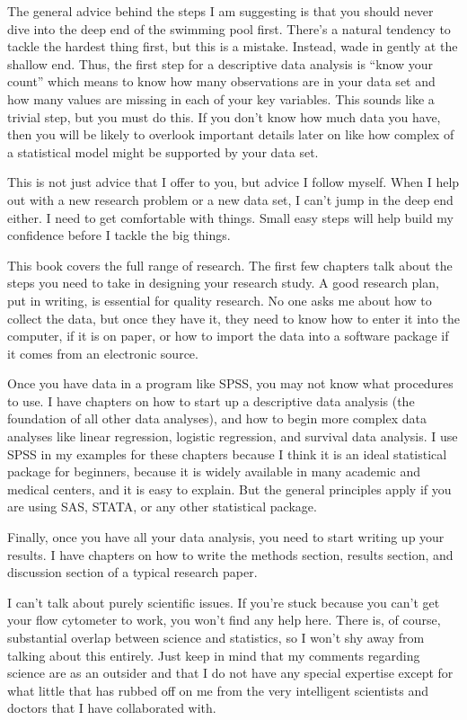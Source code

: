 \documentclass[
  letterpaper,
  DIV=11,
  numbers=noendperiod]{scrreprt}
\begin{document}
The general advice behind the steps I am suggesting is that you should
never dive into the deep end of the swimming pool first. There's a
natural tendency to tackle the hardest thing first, but this is a
mistake. Instead, wade in gently at the shallow end. Thus, the first
step for a descriptive data analysis is ``know your count'' which means
to know how many observations are in your data set and how many values
are missing in each of your key variables. This sounds like a trivial
step, but you must do this. If you don't know how much data you have,
then you will be likely to overlook important details later on like how
complex of a statistical model might be supported by your data set.

This is not just advice that I offer to you, but advice I follow myself.
When I help out with a new research problem or a new data set, I can't
jump in the deep end either. I need to get comfortable with things.
Small easy steps will help build my confidence before I tackle the big
things.

This book covers the full range of research. The first few chapters talk
about the steps you need to take in designing your research study. A
good research plan, put in writing, is essential for quality research.
No one asks me about how to collect the data, but once they have it,
they need to know how to enter it into the computer, if it is on paper,
or how to import the data into a software package if it comes from an
electronic source.

Once you have data in a program like SPSS, you may not know what
procedures to use. I have chapters on how to start up a descriptive data
analysis (the foundation of all other data analyses), and how to begin
more complex data analyses like linear regression, logistic regression,
and survival data analysis. I use SPSS in my examples for these chapters
because I think it is an ideal statistical package for beginners,
because it is widely available in many academic and medical centers, and
it is easy to explain. But the general principles apply if you are using
SAS, STATA, or any other statistical package.

Finally, once you have all your data analysis, you need to start writing
up your results. I have chapters on how to write the methods section,
results section, and discussion section of a typical research paper.

I can't talk about purely scientific issues. If you're stuck because you
can't get your flow cytometer to work, you won't find any help here.
There is, of course, substantial overlap between science and statistics,
so I won't shy away from talking about this entirely. Just keep in mind
that my comments regarding science are as an outsider and that I do not
have any special expertise except for what little that has rubbed off on
me from the very intelligent scientists and doctors that I have
collaborated with.
\end{document}
